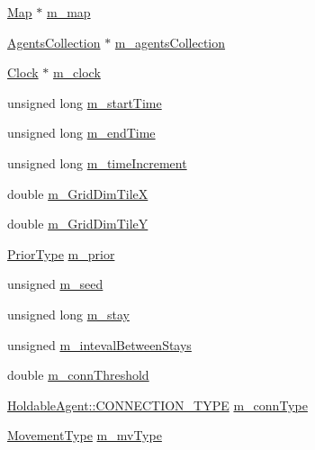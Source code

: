 \begin{DoxyCompactItemize}
\item 
\mbox{\hyperlink{class_map}{Map}} $\ast$ \mbox{\hyperlink{class_world_ae1e6f62c5b282e94ffdcaab58fcb3fb4}{m\+\_\+map}}
\item 
\mbox{\hyperlink{class_agents_collection}{Agents\+Collection}} $\ast$ \mbox{\hyperlink{class_world_ae1262689381f00828c0a639b7cbb52a3}{m\+\_\+agents\+Collection}}
\item 
\mbox{\hyperlink{class_clock}{Clock}} $\ast$ \mbox{\hyperlink{class_world_a8359eb424f01e41703faa0885a4414bf}{m\+\_\+clock}}
\item 
unsigned long \mbox{\hyperlink{class_world_a5b46814e7da7222730be62154bf10008}{m\+\_\+start\+Time}}
\item 
unsigned long \mbox{\hyperlink{class_world_ab6b8ad11e4031f3072a78f00a66e9ec5}{m\+\_\+end\+Time}}
\item 
unsigned long \mbox{\hyperlink{class_world_a97f773548fef49eb408115c097aa995d}{m\+\_\+time\+Increment}}
\item 
double \mbox{\hyperlink{class_world_afe0caad7af3f4b69c46381fd1c5f5fab}{m\+\_\+\+Grid\+Dim\+TileX}}
\item 
double \mbox{\hyperlink{class_world_a0c992a133f3fcc0467564135be1bbfc8}{m\+\_\+\+Grid\+Dim\+TileY}}
\item 
\mbox{\hyperlink{_prior_type_8h_a61286c562e68de246982fc393a7c23a5}{Prior\+Type}} \mbox{\hyperlink{class_world_af7fca82468f73094ec5ba75577b0d96a}{m\+\_\+prior}}
\item 
unsigned \mbox{\hyperlink{class_world_aa74ce0cd7a9f18e431c09dc1833ff898}{m\+\_\+seed}}
\item 
unsigned long \mbox{\hyperlink{class_world_aec7eeecfae85a75b04b382f16baf7aa0}{m\+\_\+stay}}
\item 
unsigned \mbox{\hyperlink{class_world_a44ccd94fe9ee367f2f00c59eb0ad272c}{m\+\_\+inteval\+Between\+Stays}}
\item 
double \mbox{\hyperlink{class_world_aa70fecad5b4c843379920c0011c64648}{m\+\_\+conn\+Threshold}}
\item 
\mbox{\hyperlink{class_holdable_agent_ae2c334b004d7b9c5a999cf2618e4e518}{Holdable\+Agent\+::\+C\+O\+N\+N\+E\+C\+T\+I\+O\+N\+\_\+\+T\+Y\+PE}} \mbox{\hyperlink{class_world_afeac65cddcd1e1c4fa14a17efa35be06}{m\+\_\+conn\+Type}}
\item 
\mbox{\hyperlink{_movement_type_8h_a8a93b61bc797a7d1907f42796a252493}{Movement\+Type}} \mbox{\hyperlink{class_world_a9fcf012ce7262edf5646f0720ffd7666}{m\+\_\+mv\+Type}}

\end{DoxyCompactItemize}
